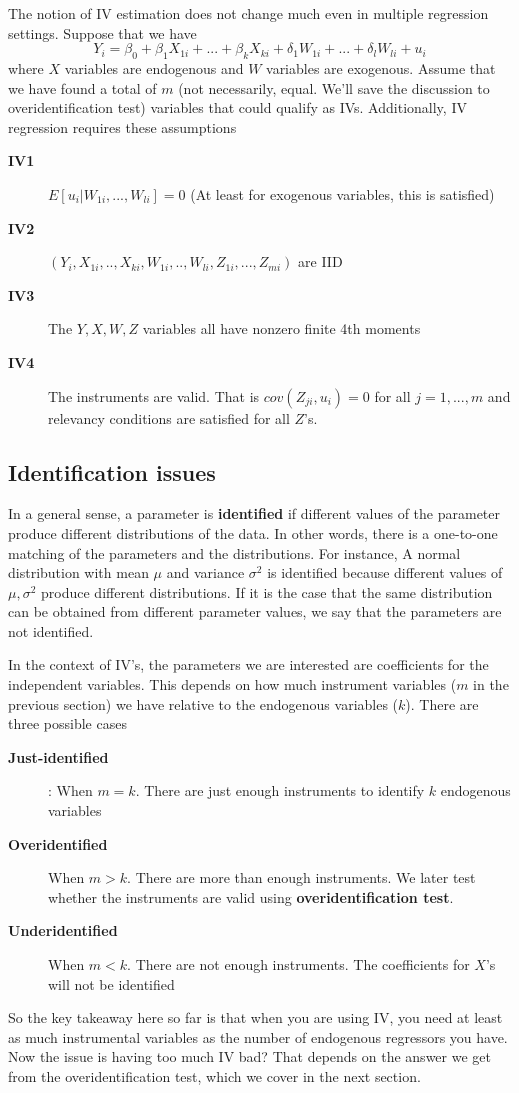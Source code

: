 \documentclass[12pt]{article}
\theoremstyle{definition}
\theoremstyle{property}
\theoremstyle{assumption}
\theoremstyle{example}
\theoremstyle{comment}
\begin{document}
The notion of IV estimation does not change much even in multiple regression settings. Suppose that we have
\[
Y_i = \beta_0 + \beta_1X_{1i} +...+ \beta_kX_{ki} + \delta_1W_{1i}+...+\delta_lW_{li}+u_i 
\]
where $X$ variables are endogenous and $W$ variables are exogenous. Assume that we have found a total of $m$ (not necessarily, equal. We'll save the discussion to overidentification test) variables that could qualify as IVs. Additionally, IV regression requires these assumptions 
\begin{description}
\item[\textbf{IV1}] $E[u_i|W_{1i},...,W_{li}]=0$ (At least for exogenous variables, this is satisfied)
\item[\textbf{IV2}] $(Y_i,X_{1i},..,X_{ki},W_{1i},..,W_{li},Z_{1i},...,Z_{mi})$ are IID
\item[\textbf{IV3}] The $Y,X,W,Z$ variables all have nonzero finite 4th moments
\item[\textbf{IV4}] The instruments are valid. That is $cov(Z_{ji},u_i)=0$ for all $j=1,...,m$ and relevancy conditions are satisfied for all $Z$'s. 
\end{description}
\subsection{Identification issues}
In a general sense, a parameter is \textbf{identified} if different values of the parameter produce different distributions of the data. In other words, there is a one-to-one matching of the parameters and the distributions. For instance, A normal distribution with mean $\mu$ and variance $\sigma^2$ is identified because different values of $\mu, \sigma^2$ produce different distributions. If it is the case that the same distribution can be obtained from different parameter values, we say that the parameters are not identified. \par\medskip

In the context of IV's, the parameters we are interested are coefficients for the independent variables. This depends on how much instrument variables ($m$ in the previous section) we have relative to the endogenous variables ($k$). There are three possible cases
\begin{description}
\item[\textbf{Just-identified}]: When $m=k$. There are just enough instruments to identify $k$ endogenous variables
\item[\textbf{Overidentified}] When $m>k$. There are more than enough instruments. We later test whether the instruments are valid using \textbf{overidentification test}.
\item[\textbf{Underidentified}] When $m<k$. There are not enough instruments. The coefficients for $X$'s will not be identified 
\end{description}
So the key takeaway here so far is that when you are using IV, you need at least as much instrumental variables as the number of endogenous regressors you have. Now the issue is having too much IV bad? That depends on the answer we get from the overidentification test, which we cover in the next section.\par\medskip
\end{document}
